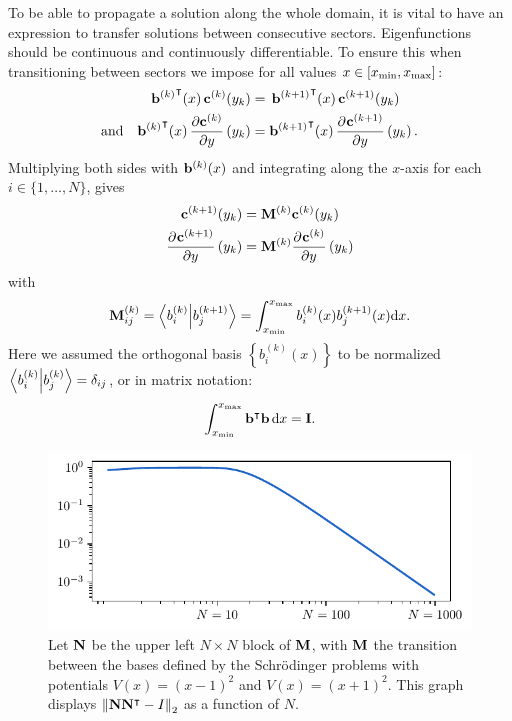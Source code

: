 To be able to propagate a solution along the whole domain, it is vital to have an expression to transfer solutions between consecutive sectors. Eigenfunctions should be continuous and continuously differentiable. To ensure this when transitioning between sectors we impose for all values $x \in [{x_{\text{min}}}, {x_{\text{max}}}]$:
\begin{align*}
  {\vb{b}^{(k)}}^\intercal(x) \, \vb{c}^{(k)}(y_k)                   & =\, {\vb{b}^{(k+1)}}^\intercal(x) \, \vb{c}^{(k+1)}(y_k)                            \\
  \text{and}\quad
  {\vb{b}^{(k)}}^\intercal(x)\,\pdv{\vb{c}^{(k)}}{y}\left(y_k\right) & = {\vb{b}^{(k+1)}}^\intercal(x)\,\pdv[]{\vb{c}^{(k+1)}}{y}\left(y_k\right) \text{.}
\end{align*}
Multiplying both sides with $\vb{b}^{(k)}(x)$ and integrating along the $x$-axis for each $i \in \{1, \dots, N\}$, gives
\begin{align*}
  \vb{c}^{(k+1)}(y_k)                       & = \vb{M}^{(k)} \vb{c}^{(k)}(y_k)                       \\
  \pdv[]{\vb{c}^{(k+1)}}{y}\left(y_k\right) & = \vb{M}^{(k)} \pdv[]{\vb{c}^{(k)}}{y}\left(y_k\right)
\end{align*}
with
$$
  \vb{M}^{(k)}_{ij} = \bra{b_{i}^{(k)}}\ket{b_{j}^{(k+1)}} = \int_{x_{\text{min}}}^{x_{\text{max}}} b_i^{(k)}(x) b_j^{(k+1)}(x) \dd x \text{.}
$$
Here we assumed the orthogonal basis $\left\{b_i^{(k)}(x)\right\}$ to be normalized $\bra{b_{i}^{(k)}}\ket{b_{j}^{(k)}} = \delta_{ij}$, or in matrix notation:
\begin{equation}\label{equ:c3_b_orthonormal}
  \int_{x_{\text{min}}}^{x_{\text{max}}} {\vb{b}}^\intercal \vb{b}\,\dd x = \vb{I}\text{.}
\end{equation}

\begin{figure}
  \begin{center}
    \includegraphics[width=\textwidth]{img/chapter3/orthogonal_m.pdf}
  \end{center}
  \caption{Let $\vb{N}$ be the upper left $N \times N$ block of $\vb{M}$, with $\vb{M}$ the transition between the bases defined by the Schrödinger problems with potentials $V(x) = (x-1)^2$ and $V(x) = (x+1)^2$. This graph displays $\left\| \vb{N} {\vb{N}}^\intercal - I \right\|_2$ as a function of $N$.}\label{fig:c3_orthogonal_m}
\end{figure}

